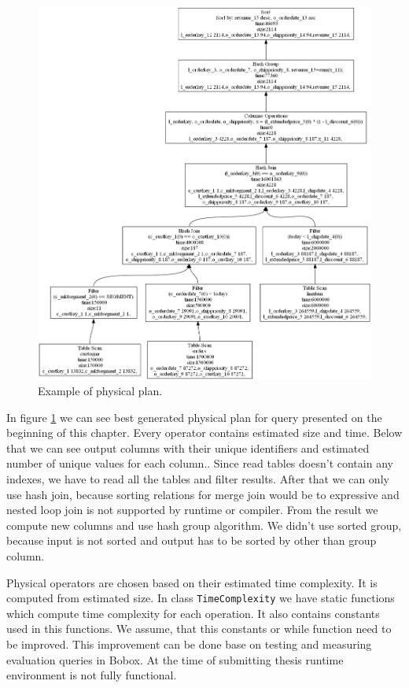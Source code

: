 \begin{figure}[h!]
  \centering
    \includegraphics[width=1.0\textwidth]{physicalplan}

      \caption{Example of physical plan.}
          \label{fig:physicalplan}
\end{figure}


In figure \ref{fig:physicalplan} we can see best generated physical plan for query presented on the beginning of this chapter. Every operator contains estimated size and time. Below that we can see output columns with their unique identifiers and estimated number of unique values for each column.. Since read tables doesn't contain any indexes, we have to read all the tables and filter results. After that we can only use hash join, because sorting relations for merge join would be to expressive and nested loop join is not supported by runtime or compiler. From the result we compute new columns and use hash group algorithm. We didn't use sorted group, because input is not sorted and output has to be sorted by other than group column.

Physical operators are chosen based on their estimated time complexity. It is computed from estimated size. In class \texttt{TimeComplexity} we have static functions which compute time complexity for each operation. It also contains constants used in this functions. We assume, that this constants or while function need to be improved. This improvement can be done base on testing and measuring evaluation queries in Bobox. At the time of submitting thesis runtime environment is not fully functional.




